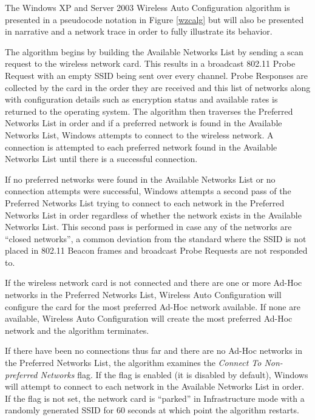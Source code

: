 \documentclass[10pt,twocolumn]{article}
\begin{document}
The Windows XP and Server 2003 Wireless Auto Configuration algorithm
\cite{cableguy02wac} is presented in a pseudocode notation in Figure
\ref{wzcalg} but will also be presented in narrative and a network
trace in order to fully illustrate its behavior.


The algorithm begins by building the Available Networks List by
sending a scan request to the wireless network card.  This results in
a broadcast 802.11 Probe Request with an empty SSID being sent over
every channel.  Probe Responses are collected by the card in the order
they are received and this list of networks along with configuration
details such as encryption status and available rates is returned to
the operating system.  The algorithm then traverses the Preferred
Networks List in order and if a preferred network is found in the
Available Networks List, Windows attempts to connect to the wireless
network.  A connection is attempted to each preferred network found in
the Available Networks List until there is a successful connection.

If no preferred networks were found in the Available Networks List or
no connection attempts were successful, Windows attempts a second pass
of the Preferred Networks List trying to connect to each network in
the Preferred Networks List in order regardless of whether the network
exists in the Available Networks List.  This second pass is performed
in case any of the networks are ``closed networks'', a common
deviation from the standard where the SSID is not placed in 802.11
Beacon frames and broadcast Probe Requests are not responded to.

If the wireless network card is not connected and there are one or
more Ad-Hoc networks in the Preferred Networks List, Wireless Auto
Configuration will configure the card for the most preferred Ad-Hoc
network available.  If none are available, Wireless Auto Configuration
will create the most preferred Ad-Hoc network and the algorithm
terminates.

If there have been no connections thus far and there are no Ad-Hoc
networks in the Preferred Networks List, the algorithm examines the
{\it Connect To Non-preferred Networks} flag.  If the flag is enabled
(it is disabled by default), Windows will attempt to connect to each
network in the Available Networks List in order.  If the flag is not
set, the network card is ``parked'' in Infrastructure mode with a
randomly generated SSID for 60 seconds at which point the algorithm
restarts.
\end{document}

